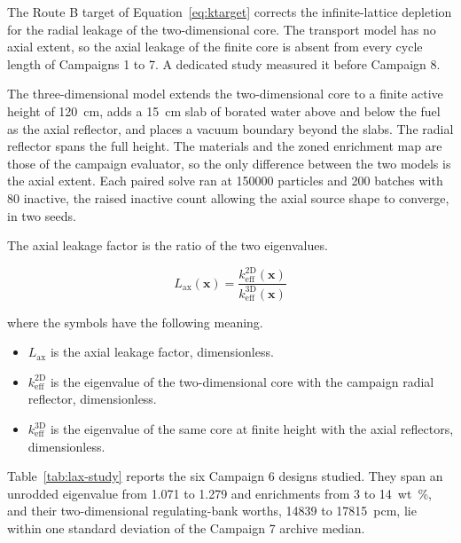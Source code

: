 The Route B target of Equation~\eqref{eq:ktarget} corrects the
infinite-lattice depletion for the radial leakage of the
two-dimensional core. The transport model has no axial extent, so the
axial leakage of the finite core is absent from every cycle length of
Campaigns 1 to 7. A dedicated study measured it before Campaign 8.

The three-dimensional model extends the two-dimensional core to a
finite active height of \SI{120}{cm}, adds a \SI{15}{cm} slab of
borated water above and below the fuel as the axial reflector, and
places a vacuum boundary beyond the slabs. The radial reflector spans
the full height. The materials and the zoned enrichment map are those
of the campaign evaluator, so the only difference between the two
models is the axial extent. Each paired solve ran at \num{150000}
particles and 200 batches with 80 inactive, the raised inactive count
allowing the axial source shape to converge, in two seeds.

The axial leakage factor is the ratio of the two eigenvalues.

\begin{equation}
L_\mathrm{ax}(\mathbf{x}) = \frac{k_\mathrm{eff}^\mathrm{2D}(\mathbf{x})}{k_\mathrm{eff}^\mathrm{3D}(\mathbf{x})}
\label{eq:lax-def}
\end{equation}

\noindent where the symbols have the following meaning.

\begin{itemize}
  \item $L_\mathrm{ax}$ is the axial leakage factor, dimensionless.

  \item $k_\mathrm{eff}^\mathrm{2D}$ is the eigenvalue of the
        two-dimensional core with the campaign radial reflector,
        dimensionless.

  \item $k_\mathrm{eff}^\mathrm{3D}$ is the eigenvalue of the same core
        at finite height with the axial reflectors, dimensionless.
\end{itemize}

Table~\ref{tab:lax-study} reports the six Campaign 6 designs studied.
They span an unrodded eigenvalue from 1.071 to 1.279 and enrichments
from 3 to \SI{14}{wt\%}, and their two-dimensional regulating-bank
worths, \num{14839} to \SI{17815}{pcm}, lie within one standard
deviation of the Campaign 7 archive median.

